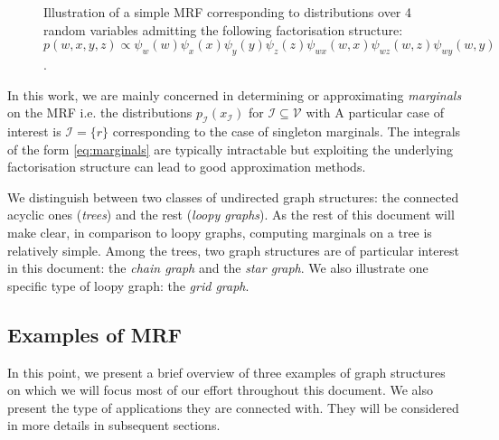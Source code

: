 \begin{figure}[!h]
\center
{}
\caption{\label{fig:simple-MRF}Illustration of a simple MRF corresponding to distributions over 4 random variables admitting the following factorisation structure:\\ $p(w,x,y,z)\propto \psi_{w}(w)\psi_{x}(x)\psi_{y}(y)\psi_{z}(z)\psi_{wx}(w,x)\psi_{wz}(w,z)\psi_{wy}(w,y)$.}
\end{figure}
In this work, we are mainly concerned in determining or approximating  \emph{marginals} on the MRF i.e. the distributions $p_{\mathcal I}(x_{\mathcal I})$ for $\mathcal I\subseteq\mathcal V$  with
A particular case of interest is $\mathcal I=\{r\}$ corresponding to the case of singleton marginals. The integrals of the form \eqref{eq:marginals} are typically intractable but exploiting the underlying factorisation structure can lead to good approximation methods.

We distinguish between two classes of undirected graph structures: the connected acyclic ones (\emph{trees}) and the rest (\emph{loopy graphs}). As the rest of this document will make clear, in comparison to loopy graphs, computing marginals on a tree is relatively simple. Among the trees, two graph structures are of particular interest in this document: the \emph{chain graph} and the \emph{star graph}. We also illustrate one specific type of loopy graph: the \emph{grid graph}.


\subsection{Examples of MRF}
In this point, we present a brief overview of three examples of graph structures on which we will focus most of our effort throughout this document. We also present the type of applications they are connected with. They will be considered in more details in subsequent sections.

